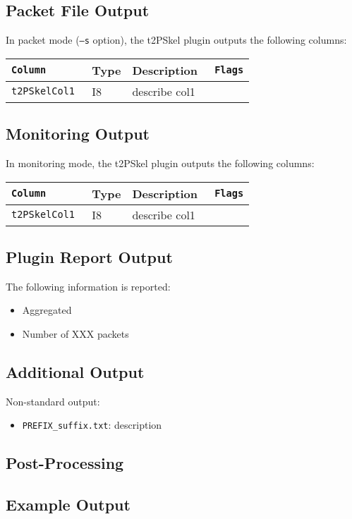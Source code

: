 \documentclass[documentation]{subfiles}
\begin{document}
\subsection{Packet File Output}
In packet mode ({\tt --s} option), the t2PSkel plugin outputs the following columns:
\begin{longtable}{>{\tt}lll>{\tt\small}l}
    \toprule
    {\bf Column} & {\bf Type} & {\bf Description} & {\bf Flags}\\
    \midrule\endhead%
    t2PSkelCol1 & I8 & describe col1 & \\
    \bottomrule
\end{longtable}

\subsection{Monitoring Output}
In monitoring mode, the t2PSkel plugin outputs the following columns:
\begin{longtable}{>{\tt}lll>{\tt\small}l}
    \toprule
    {\bf Column} & {\bf Type} & {\bf Description} & {\bf Flags}\\
    \midrule\endhead%
    t2PSkelCol1 & I8 & describe col1 & \\
    \bottomrule
\end{longtable}

\subsection{Plugin Report Output}
The following information is reported:
\begin{itemize}
    \item Aggregated {\tt{}}
    \item Number of XXX packets
\end{itemize}

\subsection{Additional Output}
Non-standard output:
\begin{itemize}
    \item {\tt PREFIX\_suffix.txt}: description
\end{itemize}

\subsection{Post-Processing}

\subsection{Example Output}
\end{document}
